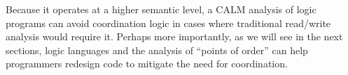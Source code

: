 Because it operates at a higher semantic level, a CALM analysis of logic programs can avoid coordination logic in cases where traditional read/write analysis would require it.  Perhaps more importantly, as we will see in the next sections, logic languages and the analysis of ``points of order'' can help programmers redesign code to mitigate the need for coordination.


% 




